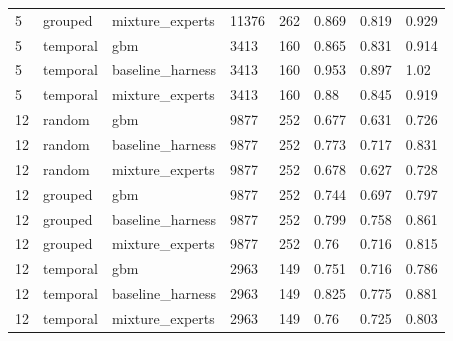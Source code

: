 \begin{tabular}{llllllll}
5 & grouped & mixture\_experts & 11376 & 262 & 0.869 & 0.819 & 0.929 \\
5 & temporal & gbm & 3413 & 160 & 0.865 & 0.831 & 0.914 \\
5 & temporal & baseline\_harness & 3413 & 160 & 0.953 & 0.897 & 1.02 \\
5 & temporal & mixture\_experts & 3413 & 160 & 0.88 & 0.845 & 0.919 \\
12 & random & gbm & 9877 & 252 & 0.677 & 0.631 & 0.726 \\
12 & random & baseline\_harness & 9877 & 252 & 0.773 & 0.717 & 0.831 \\
12 & random & mixture\_experts & 9877 & 252 & 0.678 & 0.627 & 0.728 \\
12 & grouped & gbm & 9877 & 252 & 0.744 & 0.697 & 0.797 \\
12 & grouped & baseline\_harness & 9877 & 252 & 0.799 & 0.758 & 0.861 \\
12 & grouped & mixture\_experts & 9877 & 252 & 0.76 & 0.716 & 0.815 \\
12 & temporal & gbm & 2963 & 149 & 0.751 & 0.716 & 0.786 \\
12 & temporal & baseline\_harness & 2963 & 149 & 0.825 & 0.775 & 0.881 \\
12 & temporal & mixture\_experts & 2963 & 149 & 0.76 & 0.725 & 0.803 \\
\bottomrule
\end{tabular}